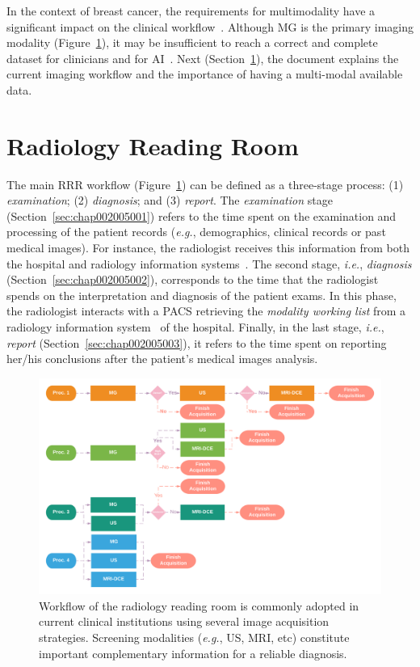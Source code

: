 In the context of breast cancer, the requirements for multimodality have a significant impact on the clinical workflow~\cite{https://doi.org/10.1002/cncr.32910}.
Although \ac{MG} is the primary imaging modality (Figure~\ref{fig:fig018}), it may be insufficient to reach a correct and complete dataset for clinicians and for \ac{AI}~\cite{DANA2020541}.
Next (Section~\ref{sec:chap002005}), the document explains the current imaging workflow and the importance of having a multi-modal available data.

\section{Radiology Reading Room}
\label{sec:chap002005}

The main \ac{RRR} workflow (Figure~\ref{fig:fig018}) can be defined as a three-stage process:
(1) {\it examination};
(2) {\it diagnosis}; and
(3) {\it report}.
The {\it examination} stage (Section~\ref{sec:chap002005001}) refers to the time spent on the examination and processing of the patient records ({\it e.g.}, demographics, clinical records or past medical images).
For instance, the radiologist receives this information from both the hospital and radiology information systems~\cite{islam2018recent}.
The second stage, {\it i.e.}, {\it diagnosis} (Section~\ref{sec:chap002005002}), corresponds to the time that the radiologist spends on the interpretation and diagnosis of the patient exams.
In this phase, the radiologist interacts with a \ac{PACS} retrieving the {\it modality working list} from a radiology information system~\cite{DIROBERTO2016950} of the hospital.
Finally, in the last stage, {\it i.e.}, {\it report} (Section~\ref{sec:chap002005003}), it refers to the time spent on reporting her/his conclusions after the patient's medical images analysis.

\begin{figure}[htbp]
\centering
\includegraphics[width=\columnwidth]{images/fig018}
\caption{Workflow of the radiology reading room is commonly adopted in current clinical institutions using several image acquisition strategies. Screening modalities ({\it e.g.}, US, MRI, etc) constitute important complementary information for a reliable diagnosis.}
\label{fig:fig018}
\end{figure}

